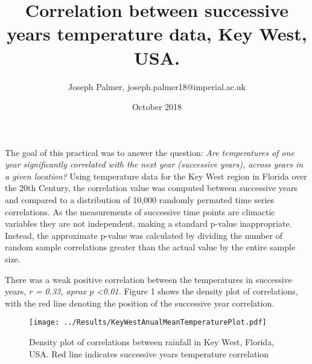 \documentclass[12pt]{article}
\title{Correlation between successive years temperature data, Key West, USA.}
\author{Joseph Palmer, joseph.palmer18@imperial.ac.uk}
\date{October 2018}
\begin{document}
	\maketitle
	The goal of this practical was to answer the question: \textit{Are temperatures of one year significantly correlated with the next year (successive years), across years in a given location?} Using temperature data for the Key West region in Florida over the 20th Century, the correlation value was computed between successive years and compared to a distribution of 10,000 randomly permuted time series correlations. As the measurements of successive time points are climactic variables they are not independent, making a standard p-value inappropriate. Instead, the approximate p-value was calculated by dividing the number of random sample correlations greater than the actual value by the entire sample size. 
	
	
	There was a weak positive correlation between the temperatures in successive years, \textit{r = 0.33, aprox p \textless 0.01.} Figure 1 shows the density plot of correlations, with the red line denoting the position of the successive year correlation.
	
	\begin{figure}[ht]
		\texttt{[image: ../Results/KeyWestAnualMeanTemperaturePlot.pdf]}
		\caption{Density plot of correlations between rainfall in Key West, Florida, USA. Red line indicates successive years temperature correlation}
	\end{figure}
		
\end{document}
